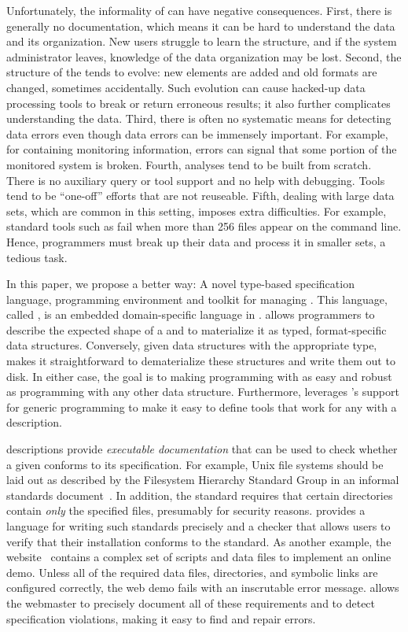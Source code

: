 Unfortunately, the informality of \filestores{} can have
negative consequences.  First, there is generally no documentation,
which means it can be hard to understand the data and its
organization.  New users struggle to learn the structure, and if
the system administrator leaves, knowledge of the data
organization may be lost.  Second, the structure of the \filestore{} tends
to evolve: new elements are added and old formats are changed, sometimes
accidentally.  Such evolution can cause hacked-up data processing
tools to break or return erroneous results; it also further complicates
understanding the data.  Third, there is often no
systematic means for detecting data errors even though data errors can
be immensely
important.  For example, for \filestores{} containing monitoring information,
errors can signal that some portion of the monitored system is broken.
Fourth, analyses tend to be built from scratch.
There is no auxiliary query or tool support and no help with debugging.
Tools tend to be ``one-off'' efforts that are not
reuseable.  Fifth, dealing with
large data sets, which are common in this setting, imposes extra
difficulties.  For example,  standard tools
such as  fail when more than 256 files appear on the
command line.  Hence, programmers must  break up their data
and process it in smaller sets, a tedious task.

In this paper, we propose a better way: A novel type-based
specification language, programming environment and toolkit for
managing \filestores{}.  
This language, called \forest{}, is an embedded domain-specific
language in \haskell{}.
\forest{} allows programmers to describe the expected shape of a
\filestore{} and to materialize it as typed,
format-specific \haskell{} data structures.  Conversely,
given data structures with the appropriate type, \forest{}
makes it straightforward to dematerialize these structures
and write them out to disk.  In either case, the
goal is to making programming with \filestores{} as
easy and robust as programming with any other \haskell{} data
structure.  Furthermore, \forest{} leverages
\haskell{}'s support for generic programming to make it easy to define
tools that work for any \filestore{} with a \forest{} description.  


\forest{} descriptions provide {\em executable documentation} that can
be used to check whether a given \filestore{} conforms to its
specification.  For example, Unix file systems should be laid out as
described by the Filesystem Hierarchy Standard Group in an informal
standards document~\cite{fsh}.  In addition, the standard requires that certain
directories contain \textit{only} the specified files, presumably for
security reasons. \forest{} provides a language for writing such
standards precisely and a checker that allows users to verify that
their installation conforms to the standard.  As another example, the
\pads{} website~\cite{padsweb} contains a complex set of scripts and
data files to implement an online demo.  Unless all of the required
data files, directories, and symbolic links are configured correctly,
the web demo fails with an inscrutable error message.  \forest{}
allows the \pads{} webmaster to precisely document all of these
requirements and to detect specification violations, making it easy to
find and repair errors.

